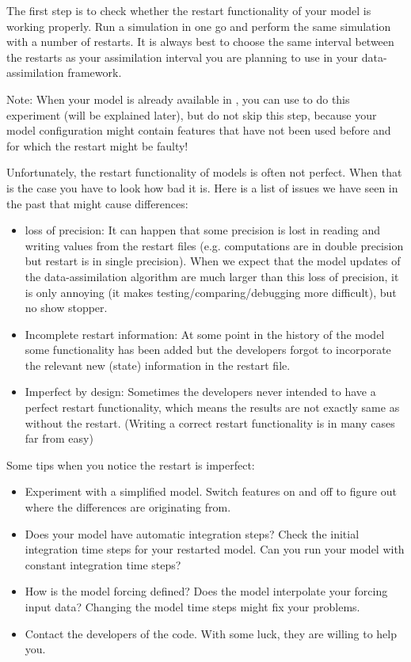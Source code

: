 The first step is to check whether the restart functionality of your model is working properly. Run a simulation in one go and perform the same simulation with a number of restarts. It is always best to choose the same interval between the restarts as your assimilation interval you are planning to use in your data-assimilation framework.

Note: When your model is already available in \oda, you can use \oda to do this experiment (will be explained later), but do not skip this step, because your model configuration might contain features that have not been used before and for which the restart might be faulty!


Unfortunately, the restart functionality of models is often not perfect. When that is the case you have to look how bad it is. Here is a list of issues we have seen in the past that might cause differences:
\begin{itemize}
\item loss of precision: It can happen that some precision is lost in reading and writing values from the restart files (e.g. computations are in double precision but restart is in single precision). When we expect that the model updates of the data-assimilation algorithm are much larger than this loss of precision, it is only annoying (it makes testing/comparing/debugging more difficult), but no show stopper.
\item Incomplete restart information: At some point in the history of the model some functionality has been added but the developers forgot to incorporate the relevant new (state) information in the restart file.
\item Imperfect by design: Sometimes the developers never intended to have a perfect restart functionality, which means the results are not exactly same as without the restart. (Writing a correct restart functionality is in many cases far from easy)
\end{itemize}

Some tips when you notice the restart is imperfect:
\begin{itemize}
\item Experiment with a simplified model. Switch features on and off to figure out where the differences are originating from.
\item Does your model have automatic integration steps? Check the initial integration time steps for your restarted model. Can you run your model with constant integration time steps?
\item How is the model forcing defined? Does the model interpolate your forcing input data? Changing the model time steps might fix your problems.
\item Contact the developers of the code. With some luck, they are willing to help you.
\end{itemize}

